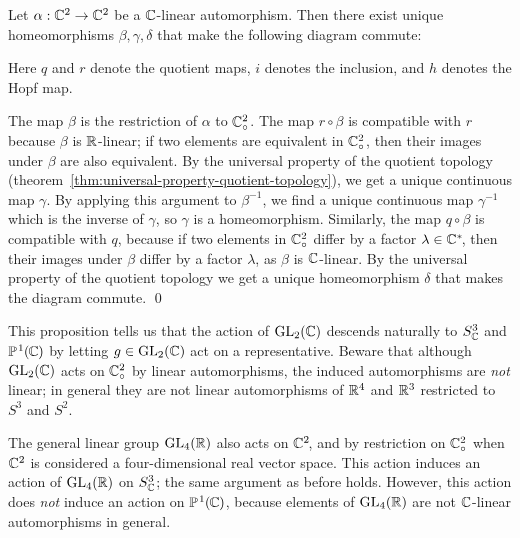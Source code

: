 Let $\alpha : \mathbb{C}^2 \to \mathbb{C}^2$ be a $\mathbb{C}$-linear automorphism.
Then there exist unique homeomorphisms $\beta, \gamma, \delta$
that make the following diagram commute:
\begin{center}
\end{center}
Here $q$ and $r$ denote the quotient maps,
$i$ denotes the inclusion,
and $h$ denotes the Hopf map.

\proof
The map $\beta$ is the restriction of $\alpha$ to $\mathbb{C}^2_\circ$.
The map $r \circ \beta$ is compatible with $r$
because $\beta$ is $\mathbb{R}$-linear;
if two elements are equivalent in $\mathbb{C}^2_\circ$,
then their images under $\beta$ are also equivalent.
By the universal property of the quotient topology
(theorem~\ref{thm:universal-property-quotient-topology}),
we get a unique continuous map $\gamma$.
By applying this argument to $\beta^{-1}$,
we find a unique continuous map $\gamma^{-1}$ which is the inverse of $\gamma$,
so $\gamma$ is a homeomorphism.
Similarly,
the map $q \circ \beta$ is compatible with $q$,
because if two elements in $\mathbb{C}^2_\circ$ differ by a factor $\lambda \in \mathbb{C}^*\!$,
then their images under $\beta$ differ by a factor $\lambda$,
as $\beta$ is $\mathbb{C}$-linear.
By the universal property of the quotient topology
we get a unique homeomorphism $\delta$ that makes the diagram commute.
\qed

This proposition tells us that the action of $\operatorname{GL}_2(\mathbb{C})$
descends naturally to $S^3_{\mathbb{C}}$ and $\mathbb{P}^{\hspace{0.8pt}1}\hspace{-0.3pt}(\hspace{-0.7pt}\mathbb{C}\hspace{-0.3pt})$
by letting $g \in \operatorname{GL}_2(\mathbb{C})$ act on a representative.
Beware that although $\operatorname{GL}_2(\mathbb{C})$ acts on $\mathbb{C}^2_\circ$ by linear automorphisms,
the induced automorphisms are \emph{not} linear;
in general they are not linear automorphisms of $\mathbb{R}^4$ and $\mathbb{R}^3$
restricted to $S^3$ and $S^2\!$.

The general linear group $\operatorname{GL}_4(\mathbb{R})$ also acts on $\mathbb{C}^2\!$,
and by restriction on $\mathbb{C}^2_\circ$
when $\mathbb{C}^2$ is considered a four-dimensional real vector space.
This action induces an action of $\operatorname{GL}_4(\mathbb{R})$ on $S^3_{\mathbb{C}}$;
the same argument as before holds.
However, this action does \emph{not} induce an action on $\mathbb{P}^{\hspace{0.8pt}1}\hspace{-0.3pt}(\hspace{-0.7pt}\mathbb{C}\hspace{-0.3pt})$,
because elements of $\operatorname{GL}_4(\mathbb{R})$ are not $\mathbb{C}$-linear automorphisms in general.

